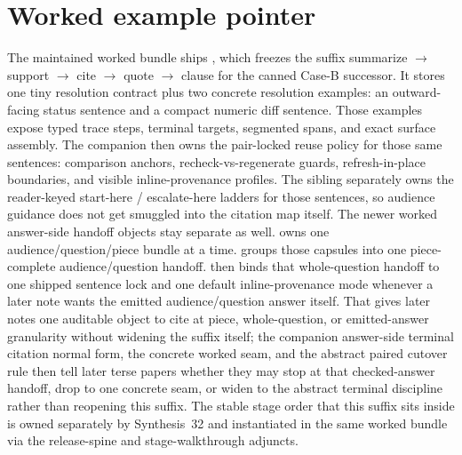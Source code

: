 \documentclass[11pt]{article}
\begin{document}
\section{Worked example pointer}
The maintained worked bundle ships , which freezes the suffix
\textsf{summarize} $\to$ \textsf{support} $\to$ \textsf{cite} $\to$ \textsf{quote} $\to$ \textsf{clause}
for the canned Case-B successor.\cite{series:workedexample}
It stores one tiny resolution contract plus two concrete resolution examples: an outward-facing status sentence and a compact numeric diff sentence.
Those examples expose typed trace steps, terminal targets, segmented spans, and exact surface assembly.
The companion  then owns the pair-locked reuse policy for those same sentences: comparison anchors, recheck-vs-regenerate guards, refresh-in-place boundaries, and visible inline-provenance profiles.\cite{series:workedexample,series:sentencelocks}
The sibling  separately owns the reader-keyed start-here / escalate-here ladders for those sentences, so audience guidance does not get smuggled into the citation map itself.\cite{series:workedexample,series:challengeroutes}
The newer worked answer-side handoff objects stay separate as well.
 owns one audience/question/piece bundle at a time.
 groups those capsules into one piece-complete audience/question handoff.
 then binds that whole-question handoff to one shipped sentence lock and one default inline-provenance mode whenever a later note wants the emitted audience/question answer itself.
That gives later notes one auditable object to cite at piece, whole-question, or emitted-answer granularity without widening the suffix itself; the companion answer-side terminal citation normal form, the concrete worked seam, and the abstract paired cutover rule then tell later terse papers whether they may stop at that checked-answer handoff, drop to one concrete seam, or widen to the abstract terminal discipline rather than reopening this suffix.\cite{series:workedexample,series:challengeanswercapsules,series:challengeanswersheets,series:challengeanswercards,series:challengeanswerreviewmenus,series:pairedterminalcitationdiscipline,series:pairedterminalcutoverrules}
The stable stage order that this suffix sits inside is owned separately by Synthesis~32 and instantiated in the same worked bundle via the release-spine and stage-walkthrough adjuncts.\cite{series:releasespine,series:workedexample}
\end{document}
